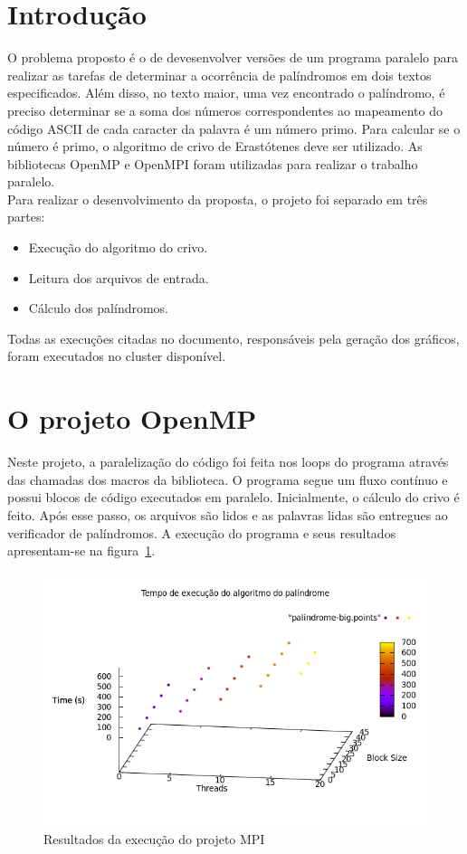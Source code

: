 \documentclass[a4paper]{article}
\begin{document}
\section{Introdução}
\indent \indent O problema proposto é o de devesenvolver versões de um programa paralelo para realizar as tarefas de determinar a ocorrência de palíndromos em dois textos especificados. Além disso, no texto maior, uma vez encontrado o palíndromo, é preciso determinar se a soma dos números correspondentes ao mapeamento do código ASCII de cada caracter da palavra é um número primo. Para calcular se o número é primo, o algoritmo de crivo de Erastótenes deve ser utilizado. As bibliotecas OpenMP e OpenMPI foram utilizadas para realizar o trabalho paralelo.\\
\indent Para realizar o desenvolvimento da proposta, o projeto foi separado em três partes:
\begin{itemize}
	\item Execução do algoritmo do crivo.
	\item Leitura dos arquivos de entrada.
	\item Cálculo dos palíndromos.
\end{itemize}
\indent \indent Todas as execuções citadas no documento, responsáveis pela geração dos gráficos, foram executados no cluster disponível.

\section{O projeto OpenMP}
\indent \indent Neste projeto, a paralelização do código foi feita nos loops do programa através das chamadas dos macros da biblioteca. O programa segue um fluxo contínuo e possui blocos de código executados em paralelo. Inicialmente, o cálculo do crivo é feito. Após esse passo, os arquivos são lidos e as palavras lidas são entregues ao verificador de palíndromos. A execução do programa e seus resultados apresentam-se na figura~\ref{graph-omp}.
\begin{figure}[float=p]
	\includegraphics[scale=0.5]{graph-omp}
	\caption{Resultados da execução do projeto MPI}
	\label{graph-omp}
\end{figure}
\end{document}
